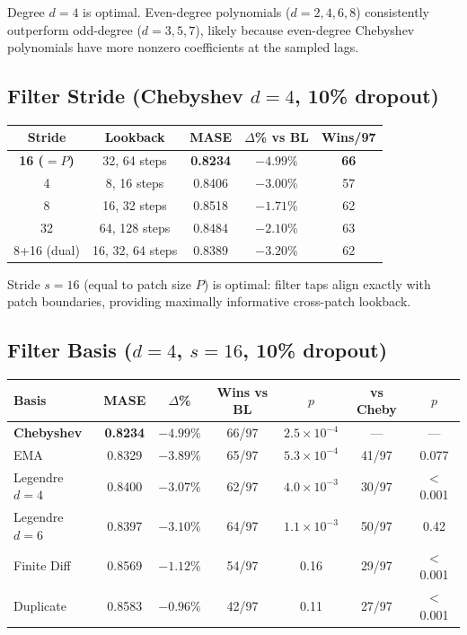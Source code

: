 \documentclass{article}
\begin{document}
Degree $d=4$ is optimal. Even-degree polynomials ($d=2, 4, 6, 8$) consistently outperform odd-degree ($d=3, 5, 7$), likely because even-degree Chebyshev polynomials have more nonzero coefficients at the sampled lags.

\subsection{Filter Stride (Chebyshev $d=4$, 10\% dropout)}

\begin{table}[h]
\centering
\small
\begin{tabular}{ccccc}
\toprule
\textbf{Stride} & \textbf{Lookback} & \textbf{MASE} & \textbf{$\Delta$\% vs BL} & \textbf{Wins/97} \\
\midrule
\textbf{16 ($=P$)} & 32, 64 steps & \textbf{0.8234} & $\mathbf{-4.99\%}$ & \textbf{66} \\
4 & 8, 16 steps & 0.8406 & $-3.00\%$ & 57 \\
8 & 16, 32 steps & 0.8518 & $-1.71\%$ & 62 \\
32 & 64, 128 steps & 0.8484 & $-2.10\%$ & 63 \\
8+16 (dual) & 16, 32, 64 steps & 0.8389 & $-3.20\%$ & 62 \\
\bottomrule
\end{tabular}
\end{table}

Stride $s=16$ (equal to patch size $P$) is optimal: filter taps align exactly with patch boundaries, providing maximally informative cross-patch lookback.

\subsection{Filter Basis ($d=4$, $s=16$, 10\% dropout)}

\begin{table}[h]
\centering
\small
\begin{tabular}{lcccccc}
\toprule
\textbf{Basis} & \textbf{MASE} & \textbf{$\Delta$\%} & \textbf{Wins vs BL} & \textbf{$p$} & \textbf{vs Cheby} & \textbf{$p$} \\
\midrule
\textbf{Chebyshev} & \textbf{0.8234} & $\mathbf{-4.99\%}$ & 66/97 & $2.5 \times 10^{-4}$ & --- & --- \\
EMA & 0.8329 & $-3.89\%$ & 65/97 & $5.3 \times 10^{-4}$ & 41/97 & 0.077 \\
Legendre $d=4$ & 0.8400 & $-3.07\%$ & 62/97 & $4.0 \times 10^{-3}$ & 30/97 & $<$0.001 \\
Legendre $d=6$ & 0.8397 & $-3.10\%$ & 64/97 & $1.1 \times 10^{-3}$ & 50/97 & 0.42 \\
Finite Diff & 0.8569 & $-1.12\%$ & 54/97 & 0.16 & 29/97 & $<$0.001 \\
Duplicate & 0.8583 & $-0.96\%$ & 42/97 & 0.11 & 27/97 & $<$0.001 \\
\bottomrule
\end{tabular}
\end{table}
\end{document}
